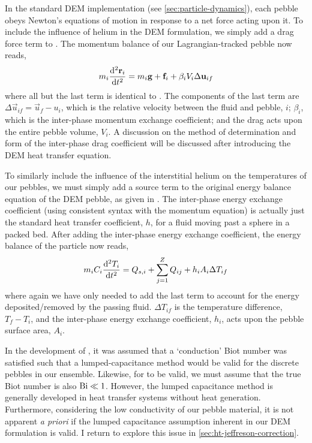 In the standard DEM implementation (see \cref{sec:particle-dynamics}), each pebble obeys Newton's equations of motion in response to a net force acting upon it. To include the influence of helium in the DEM formulation, we simply add a drag force term to . The momentum balance of our Lagrangian-tracked pebble now reads,
\begin{equation}\label{eq:cfdem-dem-momentum}
	m_i  \frac{\mathrm{d}^2{\mathbf{r}_i}}{\mathrm{d}t^2} = m_i\mathbf{g} + \mathbf{f}_i + \beta_i V_i \Delta \mathbf{u}_{if}
\end{equation}
where all but the last term is identical to . The components of the last term are $\Delta \vec{u}_{if} = \vec{u}_f - u_i$, which is the relative velocity between the fluid and pebble, $i$; $\beta_i$, which is the inter-phase momentum exchange coefficient; and the drag acts upon the entire pebble volume, $V_i$. A discussion on the method of determination and form of the inter-phase drag coefficient will be discussed after introducing the DEM heat transfer equation.

To similarly include the influence of the interstitial helium on the temperatures of our pebbles, we must simply add a source term to the original energy balance equation of the DEM pebble, as given in . The inter-phase energy exchange coefficient (using consistent syntax with the momentum equation) is actually just the standard heat transfer coefficient, $h$, for a fluid moving past a sphere in a packed bed. After adding the inter-phase energy exchange coefficient, the energy balance of the particle now reads,
\begin{equation}\label{eq:cfdem-dem-energy}
	m_iC_i \frac{\mathrm{d}^2{T_i}}{\mathrm{d}t^2} = Q_{s,i} + \sum_{j=1}^Z Q_{ij} + h_i A_i \Delta T_{if}
\end{equation}
where again we have only needed to add the last term to account for the energy deposited/removed by the passing fluid. $\Delta T_{if}$ is the temperature difference, $T_f - T_i$, and the inter-phase energy exchange coefficient, $h_i$, acts upon the pebble surface area, $A_i$.

In the development of , it was assumed that a `conduction' Biot number was satisfied such that a lumped-capacitance method would be valid for the discrete pebbles in our ensemble. Likewise, for  to be valid, we must assume that the true Biot number is also $\mathrm{Bi} \ll 1$. However, the lumped capacitance method is generally developed in heat transfer systems without heat generation. Furthermore, considering the low conductivity of our pebble material, it is not apparent \textit{a priori} if the lumped capacitance assumption inherent in our DEM formulation is valid. I return to explore this issue in \cref{sec:ht-jeffreson-correction}.

